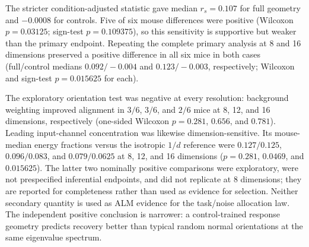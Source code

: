 \documentclass[
  aps,prl,preprint,notitlepage,superscriptaddress,nofootinbib,longbibliography,
  amsmath,amssymb
]{revtex4-2}
\begin{document}
The stricter condition-adjusted statistic gave median $r_s=0.107$ for full
geometry and $-0.0008$ for controls.  Five of six mouse differences were
positive (Wilcoxon $p=0.03125$; sign-test $p=0.109375$), so this sensitivity is
supportive but weaker than the primary endpoint.  Repeating the complete
primary analysis at 8 and 16 dimensions preserved a positive difference in
all six mice in both cases (full/control medians $0.092/-0.004$ and
$0.123/-0.003$, respectively; Wilcoxon and sign-test $p=0.015625$ for each).

The exploratory orientation test was negative at every resolution: background
weighting improved alignment in $3/6$, $3/6$, and $2/6$ mice at 8, 12, and 16
dimensions, respectively (one-sided Wilcoxon $p=0.281$, $0.656$, and $0.781$).
Leading input-channel concentration was likewise dimension-sensitive.  Its
mouse-median energy fractions versus the isotropic $1/d$ reference were
$0.127/0.125$, $0.096/0.083$, and $0.079/0.0625$ at 8, 12, and 16 dimensions
($p=0.281$, $0.0469$, and $0.015625$).  The latter two nominally positive
comparisons were exploratory, were not prespecified inferential endpoints, and
did not replicate at 8 dimensions; they are reported for completeness rather
than used as evidence for selection.  Neither secondary quantity is used as
ALM evidence for the task/noise allocation law.  The independent positive
conclusion is narrower: a control-trained response geometry predicts recovery
better than typical random normal orientations at the same eigenvalue spectrum.
\end{document}
